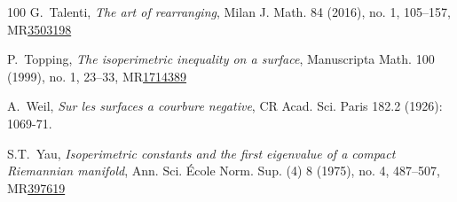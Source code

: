 \documentclass[a4paper,11pt,reqno]{amsart}
\theoremstyle{plain}
\numberwithin{equation}{section} \allowdisplaybreaks
\begin{document}
\begin{thebibliography}{100}
 G.~Talenti, \emph{The art of rearranging}, Milan J. Math. 84 (2016), no. 1, 105–157, MR\href{https://doi.org/10.1007/s00032-016-0253-6}{3503198}



 P.~Topping, \emph{The isoperimetric inequality on a surface}, Manuscripta Math. 100 (1999), no. 1, 23–33, MR\href{https://doi.org/10.1007/s002290050193}{1714389}





A.~Weil,  \emph{Sur les surfaces a courbure negative},  CR Acad. Sci. Paris 182.2 (1926): 1069-71.

 S.T.~Yau, \emph{Isoperimetric constants and the first eigenvalue of a compact Riemannian manifold}, Ann. Sci. École Norm. Sup. (4) 8 (1975), no. 4, 487–507, MR\href{http://www.numdam.org/item?id=ASENS_1975_4_8_4_487_0}{397619}




\end{thebibliography}	
\end{document}

